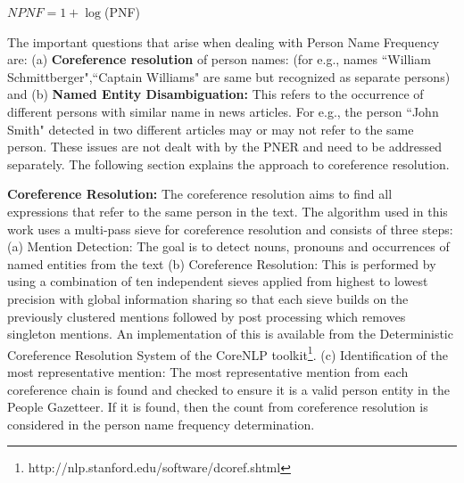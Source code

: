 \begin{center}
$NPNF=	1+\log$(PNF)
\end{center}

The important questions that arise when dealing with Person Name Frequency are: (a) \textbf{Coreference resolution} of person names: (for e.g., names ``William Schmittberger",``Captain Williams" are same but recognized as separate persons) and (b) \textbf{Named Entity Disambiguation:} This refers to the occurrence of different persons with similar name in news articles. For e.g., the person ``John Smith" detected in two different articles may or may not refer to the same person. These issues are not dealt with by the PNER and need to be addressed separately. 
The following section explains the approach to coreference resolution.


\noindent \textbf{Coreference Resolution: } The coreference resolution aims to find all expressions that refer to the same person in the text. 
The algorithm used in this work uses a multi-pass sieve for coreference resolution\cite{lee2013deterministic} and consists of three steps: (a) Mention Detection: The goal is to  detect nouns, pronouns and occurrences of named entities from the text (b) Coreference Resolution: This is performed by using a combination of ten independent sieves applied from highest to lowest precision with global information sharing so that each sieve builds on the previously clustered mentions followed by post processing which removes singleton mentions. An implementation of this is available from the Deterministic Coreference Resolution System of the CoreNLP toolkit\footnote{http://nlp.stanford.edu/software/dcoref.shtml}. (c) Identification of the most representative mention: The most representative mention from each coreference chain is found and checked to ensure it is a valid person entity in the People Gazetteer. If it is found, then the count from coreference resolution is considered in the person name frequency determination. 

